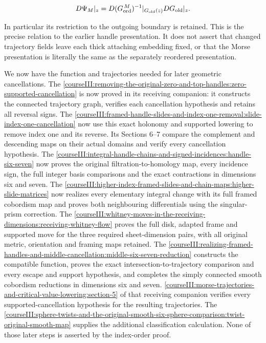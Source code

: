 \begin{equation}
D\Psi_M|_z
 =D(G_{\rm ord}^{\,M})^{-1}|_{G_{\rm old}(z)}
       DG_{\rm old}|_z.
 \label{courseIII:morse-trajectories-and-critical-value-lowering:eq:5.5}
\end{equation}

In particular its restriction to the outgoing boundary is retained. This is the precise relation to the earlier handle presentation. It does not assert that changed trajectory fields leave each thick attaching embedding fixed, or that the Morse presentation is literally the same as the separately reordered presentation.

We now have the function and trajectories needed for later geometric cancellations. The \cref{courseIII:removing-the-original-zero-and-top-handles:zero-supported-cancellation} is now proved in its receiving companion: it constructs the connected trajectory graph, verifies each cancellation hypothesis and retains all reversal signs. The \cref{courseIII:framed-handle-slides-and-index-one-removal:slide-index-one-cancellation} now use this exact holonomy and supported lowering to remove index one and its reverse. Its Sections 6--7 compare the complement and descending maps on their actual domains and verify every cancellation hypothesis. The \cref{courseIII:integral-handle-chains-and-signed-incidences:handle-six-seven} now proves the original filtration-to-homology map, every incidence sign, the full integer basis comparisons and the exact contractions in dimensions six and seven. The \cref{courseIII:higher-index-framed-slides-and-chain-maps:higher-slide-matrices} now realizes every elementary integral change with its full framed cobordism map and proves both neighbouring differentials using the singular-prism correction. The \cref{courseIII:whitney-moves-in-the-receiving-dimensions:receiving-whitney-flow} proves the full disk, adapted frame and supported move for the three required sheet-dimension pairs, with all original metric, orientation and framing maps retained. The \cref{courseIII:realizing-framed-handles-and-middle-cancellation:middle-six-seven-reduction} constructs the compatible function, proves the exact intersection-to-trajectory comparison and every escape and support hypothesis, and completes the simply connected smooth cobordism reductions in dimensions six and seven. \cref{courseIII:morse-trajectories-and-critical-value-lowering:section-5} of that receiving companion verifies every supported-cancellation hypothesis for the resulting trajectories. The \cref{courseIII:sphere-twists-and-the-original-smooth-six-sphere-comparison:twist-original-smooth-map} supplies the additional classification calculation. None of those later steps is asserted by the index-order proof.

